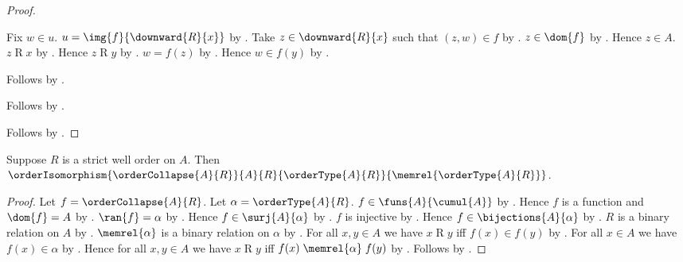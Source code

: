 \begin{proof}
\begin{subproof}
\begin{subproof}
            \begin{subproof}
                Fix $w\in u$.
                $u=\img{f}{\downward{R}{x}}$
                    by .
                Take $z\in\downward{R}{x}$ such that $(z,w)\in f$
                    by .
                $z\in\dom{f}$ by .
                Hence $z\in A$.
                $z\mathrel{R}x$ by .
                Hence $z\mathrel{R}y$
                    by
                    .
                $w=f(z)$ by .
                Hence $w\in f(y)$
                    by .
            \end{subproof}
            Follows by .
        \end{subproof}
        Follows by .
    \end{subproof}
    Follows by .
\end{proof}

\begin{theorem}\label{order_collapse_is_isomorphism}
    Suppose $R$ is a strict well order on $A$.
    Then
        $\orderIsomorphism{\orderCollapse{A}{R}}
            {A}{R}{\orderType{A}{R}}{\memrel{\orderType{A}{R}}}$.
\end{theorem}
\begin{proof}
    Let $f=\orderCollapse{A}{R}$.
    Let $\alpha=\orderType{A}{R}$.
    $f\in\funs{A}{\cumul{A}}$ by .
    Hence $f$ is a function and $\dom{f}=A$
        by .
    $\ran{f}=\alpha$ by .
    Hence $f\in\surj{A}{\alpha}$ by .
    $f$ is injective by .
    Hence $f\in\bijections{A}{\alpha}$
        by .
    $R$ is a binary relation on $A$
        by .
    $\memrel{\alpha}$ is a binary relation on $\alpha$
        by .
    For all $x,y\in A$ we have
        $x\mathrel{R}y$ iff $f(x)\in f(y)$
        by .
    For all $x\in A$ we have $f(x)\in\alpha$
        by .
    Hence for all $x,y\in A$ we have
        $x\mathrel{R}y$ iff
        $f(x)\mathrel{\memrel{\alpha}}f(y)$
        by .
    Follows by .
\end{proof}

